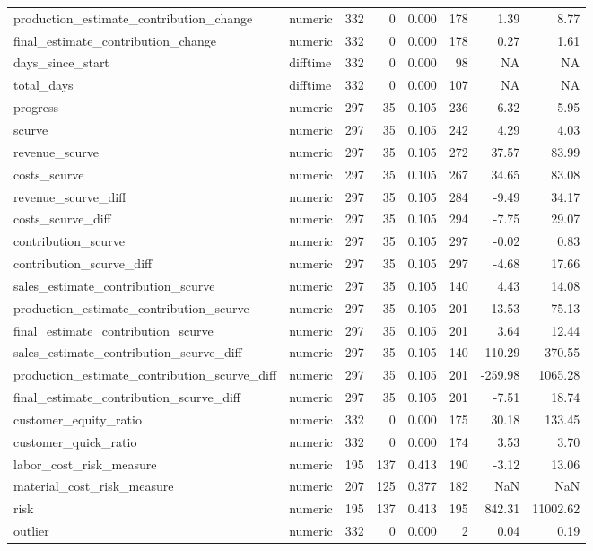\begin{landscape}
\begin{longtable}[t]{llrrrrrr}
production\_estimate\_contribution\_change & numeric & 332 & 0 & 0.000 & 178 & 1.39 & 8.77\\
final\_estimate\_contribution\_change & numeric & 332 & 0 & 0.000 & 178 & 0.27 & 1.61\\
days\_since\_start & difftime & 332 & 0 & 0.000 & 98 & NA & NA\\
total\_days & difftime & 332 & 0 & 0.000 & 107 & NA & NA\\
progress & numeric & 297 & 35 & 0.105 & 236 & 6.32 & 5.95\\
scurve & numeric & 297 & 35 & 0.105 & 242 & 4.29 & 4.03\\
revenue\_scurve & numeric & 297 & 35 & 0.105 & 272 & 37.57 & 83.99\\
costs\_scurve & numeric & 297 & 35 & 0.105 & 267 & 34.65 & 83.08\\
revenue\_scurve\_diff & numeric & 297 & 35 & 0.105 & 284 & -9.49 & 34.17\\
costs\_scurve\_diff & numeric & 297 & 35 & 0.105 & 294 & -7.75 & 29.07\\
contribution\_scurve & numeric & 297 & 35 & 0.105 & 297 & -0.02 & 0.83\\
contribution\_scurve\_diff & numeric & 297 & 35 & 0.105 & 297 & -4.68 & 17.66\\
sales\_estimate\_contribution\_scurve & numeric & 297 & 35 & 0.105 & 140 & 4.43 & 14.08\\
production\_estimate\_contribution\_scurve & numeric & 297 & 35 & 0.105 & 201 & 13.53 & 75.13\\
final\_estimate\_contribution\_scurve & numeric & 297 & 35 & 0.105 & 201 & 3.64 & 12.44\\
sales\_estimate\_contribution\_scurve\_diff & numeric & 297 & 35 & 0.105 & 140 & -110.29 & 370.55\\
production\_estimate\_contribution\_scurve\_diff & numeric & 297 & 35 & 0.105 & 201 & -259.98 & 1065.28\\
final\_estimate\_contribution\_scurve\_diff & numeric & 297 & 35 & 0.105 & 201 & -7.51 & 18.74\\
customer\_equity\_ratio & numeric & 332 & 0 & 0.000 & 175 & 30.18 & 133.45\\
customer\_quick\_ratio & numeric & 332 & 0 & 0.000 & 174 & 3.53 & 3.70\\
labor\_cost\_risk\_measure & numeric & 195 & 137 & 0.413 & 190 & -3.12 & 13.06\\
material\_cost\_risk\_measure & numeric & 207 & 125 & 0.377 & 182 & NaN & NaN\\
risk & numeric & 195 & 137 & 0.413 & 195 & 842.31 & 11002.62\\
outlier & numeric & 332 & 0 & 0.000 & 2 & 0.04 & 0.19\\*
\end{longtable}
\end{landscape}
\endgroup{}
